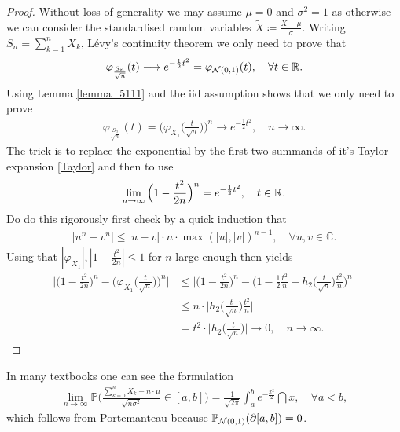 \begin{proof}[Proof]
	Without loss of generality we may assume $\mu=0$ and $\sigma^2=1$ as otherwise we can consider the standardised random variables $\tilde{X} \coloneqq \frac{X-\mu}{\sigma}$. Writing $S_n=\sum_{k=1}^n X_k$, L\'{e}vy's continuity theorem we only need to prove that
	\begin{align*}
		\varphi_{\frac{S_n}{\sqrt{n}}}(t) \longrightarrow e^{-\frac{1}{2}t^2} = \varphi_{\mathcal{N}(0,1)}(t),\quad \forall t \in \mathbb{R}.
	\end{align*}
	Using Lemma \ref{lemma_5111} and the iid assumption shows that we only need to prove
	\begin{align*}
		\varphi_{\frac{S_n}{\sqrt{n}}}(t) = \Big( \varphi_{X_1}\Big( \frac{t}{\sqrt{n}}\Big) \Big)^n \longrightarrow e^{-\frac{1}{2}t^2}, \quad n \to \infty.
	\end{align*}	
The trick is to replace the exponential by the first two summands of it's Taylor expansion \eqref{Taylor} and then to use
\begin{align*}
	\lim_{n\to\infty}\Big(1-  \frac{t^2}{2n}\Big)^{n}= e^{-\frac{1}{2}t^2},\quad t\in\mathbb{R}.
\end{align*}
Do do this rigorously first check by a quick induction that
	\begin{align*}
		\lvert u^n - v^n \rvert \leq \lvert u - v \rvert \cdot n \cdot \max(\lvert u \rvert, \lvert v \rvert )^{n-1}, \quad\forall u,v\in\mathbb{C}.
	\end{align*}
	Using that $|\varphi_{X_1}|, |1 - \frac{t^2}{2n}|\leq 1$ for $n$ large enough then yields
	\begin{align*}
		\bigg\lvert \Big( 1 - \frac{t^2}{2n} \Big)^n - \Big(\varphi_{ X_1}\big(\frac{t}{\sqrt{n}}\big)\Big)^n \bigg\rvert 
		&\leq \bigg\lvert \Big( 1 - \frac{t^2}{2n} \Big)^n - \Big( 1 - \frac{1}{2} \frac{t^2}{n} + h_2\Big( \frac{t}{\sqrt{n}} \Big) \frac{t^2}{n} \Big)^n \bigg\rvert \\
		&\leq n \cdot \Big\lvert h_2 \Big( \frac{t}{\sqrt{n}}\Big)  \frac{t^2}{n} \Big\rvert \\
		&= t^2 \cdot \Big\lvert h_2 \Big( \frac{t}{\sqrt{n}} \Big) \Big\rvert
		\rightarrow 0,\quad n \to \infty.
	\end{align*}
\end{proof}
In many textbooks one can see the formulation
	\begin{align*}
		\lim_{n\to\infty}\mathbb{P} \bigg( \frac{\sum_{k=0}^n X_k - n \cdot \mu}{\sqrt{n \sigma^2}} \in [a,b] \bigg)= \frac{1}{\sqrt{2\pi}} \int_a^b e^{- \frac{x^2}{2}} \dint x, \quad \forall a<b,
	\end{align*}
	which follows from Portemanteau because $\mathbb{P}_{\mathcal{N}(0,1)}( \partial [a,b]) = 0$.\smallskip

